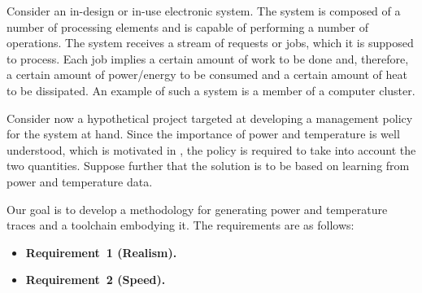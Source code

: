 Consider an in-design or in-use electronic system. The system is composed of a
number of processing elements and is capable of performing a number of
operations. The system receives a stream of requests or jobs, which it is
supposed to process. Each job implies a certain amount of work to be done and,
therefore, a certain amount of power/energy to be consumed and a certain amount
of heat to be dissipated. An example of such a system is a member of a computer
cluster.

Consider now a hypothetical project targeted at developing a management policy
for the system at hand. Since the importance of power and temperature is well
understood, which is motivated in , the policy is required to
take into account the two quantities. Suppose further that the solution is to be
based on learning from power and temperature data.

Our goal is to develop a methodology for generating power and temperature traces
and a toolchain embodying it. The requirements are as follows:

\begin{itemize}
  \item {\bfseries Requirement~1 (Realism).}

  \item {\bfseries Requirement~2 (Speed).}
\end{itemize}
